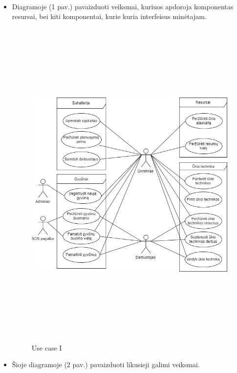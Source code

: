 \documentclass[oneside]{VUMIFPSkursinis}
\begin{document}
\begin{itemize}
\item Diagramoje (1 pav.) pavaizduoti veiksmai, kuriuos apdoroja komponentas resursai, bei kiti komponentai, kurie kuria interfeisus minėtajam.
		\begin{figure}[H]
		\centering	
	\includegraphics[width=15cm,height=17cm,keepaspectratio]{ResursaiUseCase.png}
	\caption{Use case I}
	\label{fig:UseCaseFull}
\end{figure}
\pagebreak
\item Šioje diagramoje (2 pav.) pavaizduoti likusieji galimi veiksmai.
		\begin{figure}[H]
		\centering	

\end{figure}
\end{itemize}
\end{document}

